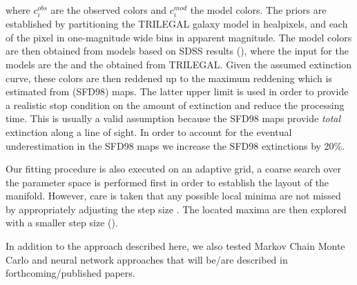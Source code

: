 where \ensuremath{c^{obs}_i} are the observed colors and \ensuremath{c^{mod}_i} the model colors. The priors are established by partitioning the TRILEGAL galaxy model \citep{dal_tio_simulating_2022} in healpixels, and each of the pixel in one-magnitude wide bins in apparent magnitude. The model colors are then obtained from models based on SDSS results (), where the input for the models are the \Mr and the \feh obtained from TRILEGAL. Given the assumed extinction curve, these colors are then reddened up to the maximum reddening which is estimated from \cite{schlegel_maps_1998} (SFD98) maps. The latter upper limit is used in order to provide a realistic stop condition on the amount of extinction and reduce the processing time. This is usually a valid assumption because the SFD98 maps provide \textit{total} extinction along a line of sight. In order to account for the eventual underestimation in the SFD98 maps we increase the SFD98 extinctions by 20\%.



Our fitting procedure is also executed on an adaptive grid, a coarse search over the parameter space is performed first in order to establish the layout of the manifold. However, care is taken that any possible local minima are not missed by appropriately adjusting the step size . The located maxima are then explored with a smaller step size ().

In addition to the approach described here, we also tested Markov Chain Monte Carlo and neural network approaches that will be/are described in forthcoming/published papers.


